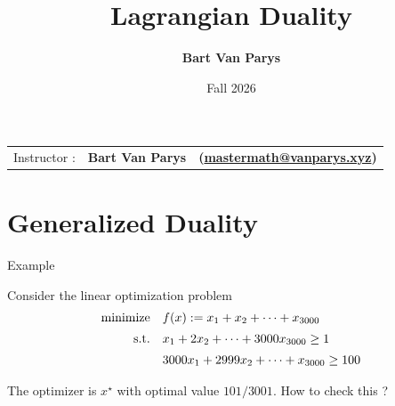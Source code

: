 \documentclass[9pt]{beamer}
\title[Continuous Optimization]{Lagrangian Duality}
\author[]{\textbf{Bart Van Parys}}
\date[]{Fall 2026}
\begin{document}
\begin{frame}  

  \maketitle

  \vspace{-2em}
  
    \begin{center}
    \begin{tabular}{lll}
      Instructor : & \textbf{Bart Van Parys} & \textbf{(\href{mailto:mastermath@vanparys.xyz}{mastermath@vanparys.xyz})} \\
    \end{tabular}
  \end{center}
  
\end{frame}

\section{Generalized Duality}

\begin{frame}{Example}

  Consider the linear optimization problem
  \[
    \begin{array}{rl}
      \operatorname{minimize} & f(x) := x_1 + x_2 + \dots + x_{3000}\\[0.5em]
      \mathrm{s.t.} & x_1 + 2 x_2 + \dots + 3000 x_{3000}\geq 1 \\[0.5em]
                & 3000 x_1 + 2999 x_2 + \dots + x_{3000} \geq 100
    \end{array}
  \]

  The optimizer is $x^\star$ with optimal value $101/3001$. How to check this ?


  \vfill


\end{frame}
\end{document}
